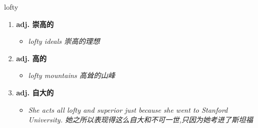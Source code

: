 
\begin{frame}
{\huge lofty}
\begin{center}
\begin{enumerate}\Large
  \item \textbf{adj. 崇高的}
  \begin{itemize}
    \item \em{\Large{lofty ideals 崇高的理想}}
  \end{itemize}
  \item \textbf{adj. 高的}
  \begin{itemize}
    \item \em{\Large{lofty mountains 高耸的山峰}}
  \end{itemize}
  \item \textbf{adj. 自大的}
  \begin{itemize}
    \item \em{\Large{She acts all lofty and superior just because she went to Stanford University. 她之所以表现得这么自大和不可一世,只因为她考进了斯坦福}}
  \end{itemize}
\end{enumerate}
\end{center}
\end{frame}
